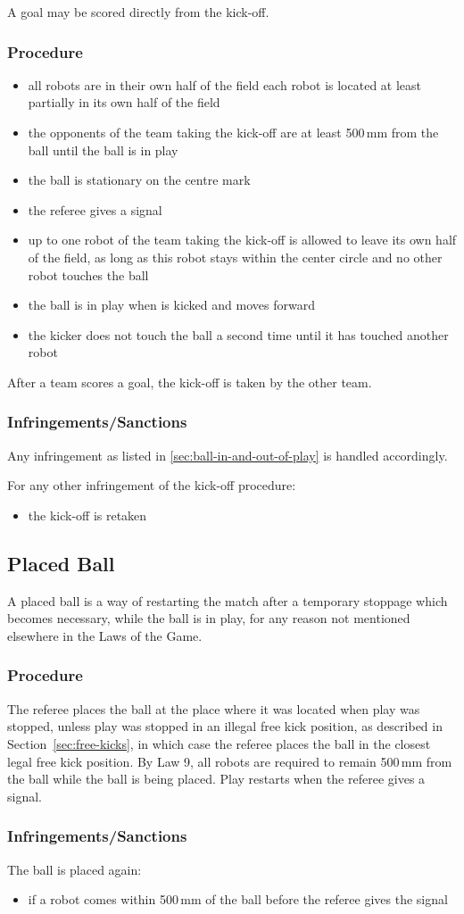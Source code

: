 A goal may be scored directly from the kick-off.

\subsubsection{Procedure}
\begin{itemize}
\item
all robots are in their own half of the field
each robot is located at least partially in its own half of the field
\item the opponents of the team taking the kick-off are at least 500\,mm from the ball until the ball is in play
\item the ball is stationary on the centre mark
\item the referee gives a signal
\item up to one robot of the team taking the kick-off is allowed to leave its own half of the field,
as long as this robot stays within the center circle and no other robot touches the ball
\item the ball is in play when is kicked and moves forward
\item the kicker does not touch the ball a second time until it has touched another robot
\end{itemize}

After a team scores a goal, the kick-off is taken by the other team.

\subsubsection{Infringements/Sanctions}
Any infringement as listed in \autoref{sec:ball-in-and-out-of-play} is handled accordingly.

For any other infringement of the kick-off procedure:
\begin{itemize}
\item the kick-off is retaken
\end{itemize}

\subsection{Placed Ball}
\label{sec:placedBall}
A placed ball is a way of restarting the match after a temporary stoppage which becomes necessary, while the ball is in play, for any reason not mentioned elsewhere in the Laws of the Game.

\subsubsection{Procedure}
The referee places the ball at the place where it was located when play was stopped, unless
play was stopped in an illegal free kick position, as described in Section~\ref{sec:free-kicks},
in which case the referee places the ball in the closest legal free kick position.
By Law 9, all robots are required to remain 500\,mm from the ball while the ball is being placed.
Play restarts when the referee gives a signal.

\subsubsection{Infringements/Sanctions}
The ball is placed again:
\begin{itemize}
\item if a robot comes within 500\,mm of the ball before the referee gives the signal
\end{itemize}
